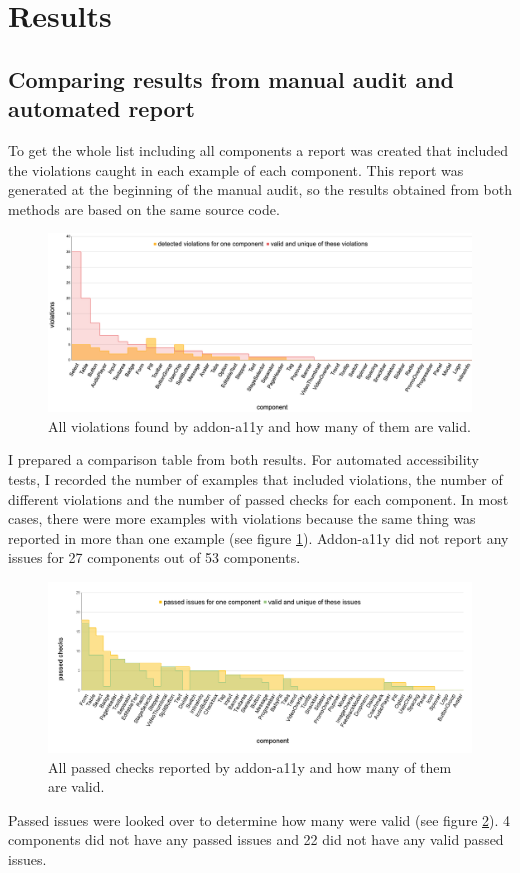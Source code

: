 \documentclass{master_thesis}
\begin{document}
\section{Results}


\subsection{Comparing results from manual audit and automated report}

To get the whole list including all components a report was created that included the violations caught in each example of each component. This report was generated at the beginning of the manual audit, so the results obtained from both methods are based on the same source code.
\begin{figure}[H]
	\includegraphics[width=\textwidth]{img/audit-failed.png}
	\caption{All violations found by addon-a11y and how many of them are valid.}
	\label{fig:audit-failed}
\end{figure}

I prepared a comparison table from both results. For automated accessibility tests, I recorded the number of examples that included violations, the number of different violations and the number of passed checks for each component. In most cases, there were more examples with violations because the same thing was reported in more than one example (see figure \ref{fig:audit-failed}). Addon-a11y did not report any issues for 27 components out of 53 components.

\begin{figure}[H]
	\includegraphics[width=\textwidth]{img/audit-passed.png}
	\caption{All passed checks reported by addon-a11y and how many of them are valid. }
	\label{fig:audit-passed}
\end{figure}
Passed issues were looked over to determine how many were valid (see figure \ref{fig:audit-passed}). 4 components did not have any passed issues and 22 did not have any valid passed issues.
\end{document}
